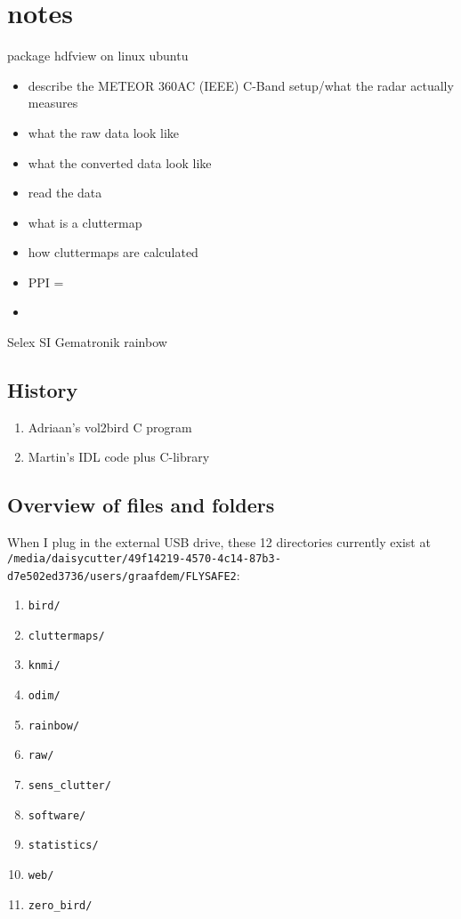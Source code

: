 \chapter{notes}
\label{ch:notes}


package hdfview on linux ubuntu

\begin{itemize}
\item{describe the METEOR 360AC (IEEE) C-Band setup/what the radar actually measures}
\item{what the raw data look like}
\item{what the converted data look like}
\item{read the data}
\item{what is a cluttermap}
\item{how cluttermaps are calculated}
\item{PPI = }
\item{}

\end{itemize}


Selex SI
Gematronik
rainbow


\section{History}

\begin{enumerate}
\item{Adriaan's vol2bird C program}
\item{Martin's IDL code plus C-library}
\end{enumerate}


\section{Overview of files and folders}
When I plug in the external USB drive, these 12 directories currently exist at \texttt{/media/daisycutter/49f14219-4570-4c14-87b3-d7e502ed3736/users/graafdem/FLYSAFE2}:
\begin{enumerate}
\item{\texttt{bird/}}
\item{\texttt{cluttermaps/}}
\item{\texttt{knmi/}}
\item{\texttt{odim/}}
\item{\texttt{rainbow/}}
\item{\texttt{raw/}}
\item{\texttt{sens\_clutter/}}
\item{\texttt{software/}}
\item{\texttt{statistics/}}
\item{\texttt{web/}}
\item{\texttt{zero\_bird/}}
\end{enumerate}


